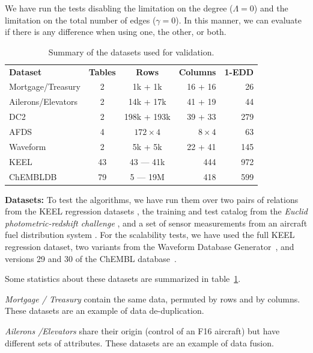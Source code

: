 We have run the tests disabling the limitation on the degree ($\Lambda = 0$) and
the limitation on the total number of edges ($\gamma = 0$). In this manner, we can
evaluate if there is any difference when using one, the other, or both.

\begin{table}[ht]
    \caption{Summary of the datasets used for validation.}
    \label{tab:dataset_summary}
    \centering
    \begin{tabular}{l c c r r}
        \textbf{Dataset}   & \textbf{Tables} & \textbf{Rows} & \textbf{Columns} & \textbf{1-EDD} \\
        Mortgage/Treasury  & 2               &   1k + 1k   & 16 + 16 &  26 \\
        Ailerons/Elevators & 2               &  14k + 17k  & 41 + 19 &  44  \\
        DC2                & 2               & 198k + 193k & 39 + 33 & 279 \\
        AFDS               & 4               & $172 \times 4$ & $8 \times 4$ & 63 \\
        Waveform           & 2               & 5k + 5k     & 22 + 41 & 145 \\
        KEEL      & 43              & 43 --- 41k  & 444 & 972 \\
        ChEMBLDB           & 79              & 5 --- 19M   & 418 & 599 \\
    \end{tabular}
\end{table}

\textbf{Datasets:} To test the algorithms, we have run them over two pairs of relations from the KEEL
regression datasets \cite{alcala2011keel}, the training and test catalog from the
\textit{Euclid photometric-redshift challenge} \cite{EuclidDesprez2020},
and a set of sensor measurements from an aircraft fuel distribution
system \cite{Gheraibia2019}. For the scalability tests, we have used the full
KEEL regression dataset, two variants from the Waveform Database
Generator~\cite{Dua:2019,breiman_classification_1984},
and versions 29 and 30 of the ChEMBL database~\cite{gaulton_chembl_2016}.

Some statistics about these datasets are summarized in table~\ref{tab:dataset_summary}.

\emph{Mortgage / Treasury} contain the same data, permuted by rows and by columns.
These datasets are an example of data de-duplication.

\emph{Ailerons /Elevators} share their origin (control of an F16 aircraft)
but have different sets of attributes. These datasets are an example of data fusion.

